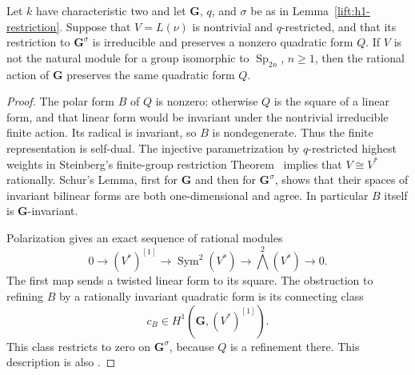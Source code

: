 \begin{proposition}
\label{lift:quadratic}
Let $k$ have characteristic two and let $\mathbf G$, $q$, and $\sigma$
be as in Lemma~\ref{lift:h1-restriction}.  Suppose that $V=L(\nu)$ is
nontrivial and $q$-restricted, and that its restriction to
$\mathbf G^\sigma$ is irreducible and preserves a nonzero quadratic
form $Q$.  If $V$ is not the natural module for a group isomorphic to
$\operatorname{Sp}_{2n}$, $n\geq1$, then
the rational action of $\mathbf G$ preserves the same quadratic form
$Q$.
\end{proposition}

\begin{proof}
The polar form $B$ of $Q$ is nonzero: otherwise $Q$ is the square of a
linear form, and that linear form would be invariant under the
nontrivial irreducible finite action.  Its radical is invariant, so $B$
is nondegenerate.  Thus the finite representation is self-dual.  The
injective parametrization by $q$-restricted highest weights in
Steinberg's finite-group restriction Theorem~\cite[Theorem~43]{SteinbergNotes}
implies that $V\cong V^*$ rationally.  Schur's Lemma, first for
$\mathbf G$ and then for $\mathbf G^\sigma$, shows that their spaces of
invariant bilinear forms are both one-dimensional and agree.
In particular $B$ itself is $\mathbf G$-invariant.

Polarization gives an exact sequence of rational modules
\begin{equation}\label{lift:polarization}
 0\longrightarrow(V^*)^{[1]}
 \longrightarrow\operatorname{Sym}^2(V^*)
 \longrightarrow\bigwedge^2(V^*)\longrightarrow0.
\end{equation}
The first map sends a twisted linear form to its square.  The
obstruction to refining $B$ by a rationally invariant quadratic form
is its connecting class
\[
 c_B\in H^1(\mathbf G,(V^*)^{[1]}).
\]
This class restricts to zero on $\mathbf G^\sigma$, because $Q$ is a
refinement there.  This description is also
\cite[Proposition~3.6 and Corollary~3.9]{GaribaldiNakano2016}.


\end{proof}
